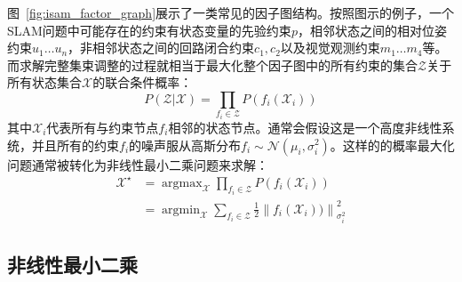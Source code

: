 图~\ref{fig:isam_factor_graph}展示了一类常见的因子图结构。按照图示的例子，一个SLAM问题中可能存在的约束有状态变量的先验约束$p$，相邻状态之间的相对位姿约束$u_1 \dots u_n$，非相邻状态之间的回路闭合约束$c_1,c_2$以及视觉观测约束$m_1 \dots m_4$等。而求解完整集束调整的过程就相当于最大化整个因子图中的所有约束的集合$\mathcal{Z}$关于所有状态集合$\mathcal{X}$的联合条件概率：
\begin{equation}
    P(\mathcal{Z}|\mathcal{X}) = \prod_{f_i\in\mathcal{Z}} P(f_i(\mathcal{X}_i))
\end{equation}
其中$\mathcal{X}_i$代表所有与约束节点$f_i$相邻的状态节点。通常会假设这是一个高度非线性系统，并且所有的约束$f_i$的噪声服从高斯分布$f_i\sim\mathcal{N}(\mu_i, \sigma_i^2)$。这样的的概率最大化问题通常被转化为非线性最小二乘问题来求解：
\begin{equation}
\begin{aligned}
    \mathcal{X}^\star &= \mathop{\arg\max}_{\mathcal{X}}
                         \prod_{f_i\in\mathcal{Z}} P(f_i(\mathcal{X}_i)) \\
                      &= \mathop{\arg\min}_{\mathcal{X}}
                         \sum_{f_i\in\mathcal{Z}} \tfrac{1}{2}
                         \left\| f_i(\mathcal{X}_i)) \right\|_{\sigma_i^2}^2
\end{aligned}
\end{equation}

\subsection{非线性最小二乘}

